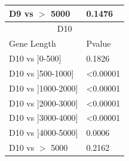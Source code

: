 \documentclass[a4,center]{NAR} %
\begin{document}
\begin{table}[b]
{\begin{tabular} {|l|l|}
\hline
D9 vs  $>$ 5000& 0.1476  \\
\hline
\multicolumn{2}{|c|}{D10} \\
\hline
Gene Length&Pvalue\\
\hline
D10 vs ]0-500] &0.1826   \\
\hline
D10 vs  ]500-1000] &\textless 0.00001    \\
\hline
D10 vs  ]1000-2000]&\textless 0.00001   \\
\hline
D10 vs  ]2000-3000] &\textless 0.00001   \\
\hline
D10 vs  ]3000-4000] &\textless 0.00001  \\
\hline
D10 vs  ]4000-5000] &0.0006   \\
\hline
D10 vs  $>$ 5000&0.2162  \\
\hline
\end{tabular}%
}
 
\end{table}
\end{document}
